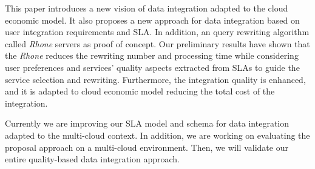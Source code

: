 This paper introduces a new vision of data integration adapted to the cloud economic model. It also proposes a new approach for data integration based on user integration requirements and SLA. In addition, an query rewriting algorithm called \textit{Rhone} servers as proof of concept. Our preliminary results have shown that the \textit{Rhone} reduces the rewriting number and processing time while considering user preferences and services' quality aspects extracted from SLAs to guide the service selection and rewriting. Furthermore, the integration quality is enhanced, and it is adapted to cloud economic model reducing the total cost of the integration.

Currently we are improving our SLA model and schema for data integration adapted
to the multi-cloud context.  In addition, we are working on evaluating the
proposal approach on a multi-cloud environment. Then, we will validate our
entire quality-based data integration approach.
